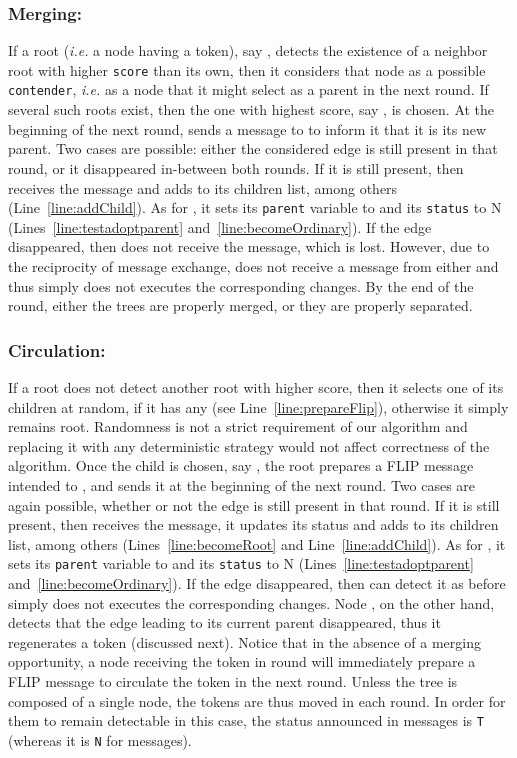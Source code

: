 \documentclass[twocolumn]{article}
\begin{document}
\subsubsection{Merging:} 
If a root ({\it i.e.} a node having a token), say , detects the
existence of a neighbor root with higher {\tt score} than its own,
then it considers that node as a possible \texttt{contender}, {\it
  i.e.} as a node that it might select as a parent in the next round.
If several such roots exist, then the one with highest score, say ,
is chosen. At the beginning of the next round,  sends a 
message to  to inform it that it is its new parent. Two cases are
possible: either the considered edge is still present in that round,
or it disappeared in-between both rounds. If it is still present, then
 receives the message and adds  to its children list, among others
(Line~\ref{line:addChild}). As for , it sets its {\tt parent}
variable to  and its {\tt status} to N
(Lines~\ref{line:testadoptparent} and~\ref{line:becomeOrdinary}). If
the edge disappeared, then  does not receive the message, which is
lost. However, due to the reciprocity of message exchange,  does
not receive a message from  either and thus simply does not
executes the corresponding changes. By the end of the round, either
the trees are properly merged, or they are properly separated.


\subsubsection{Circulation:} If a root  does not detect another
root with higher score, then it selects one of its children at random,
if it has any (see Line~\ref{line:prepareFlip}), otherwise it simply
remains root. Randomness is not a strict requirement of our algorithm
and replacing it with any deterministic strategy would not affect
correctness of the algorithm. Once the child is chosen, say , the
root prepares a FLIP message intended to , and sends it at the
beginning of the next round. Two cases are again possible, whether or
not the edge  is still present in that round. If it is still
present, then  receives the message, it updates its status and adds
 to its children list, among others (Lines~\ref{line:becomeRoot}
and Line~\ref{line:addChild}). As for , it sets its {\tt parent}
variable to  and its {\tt status} to N
(Lines~\ref{line:testadoptparent} and~\ref{line:becomeOrdinary}). If
the edge disappeared, then  can detect it as before simply does not
executes the corresponding changes. Node , on the other hand,
detects that the edge leading to its current parent disappeared, thus
it regenerates a token (discussed next). Notice that in the absence of
a merging opportunity, a node receiving the token in round  will
immediately prepare a FLIP message to circulate the token in the next
round. Unless the tree is composed of a single node, the tokens are
thus moved in each round. In order for them to remain detectable in
this case, the status announced in  messages is {\tt T} (whereas
it is {\tt N} for  messages).
\end{document}
